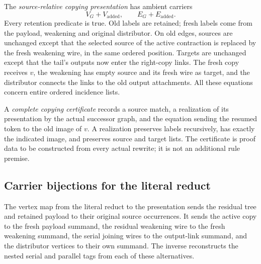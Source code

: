


The \emph{source-relative copying presentation} has ambient carriers
\[
 V_G+V_{\mathrm{added}},\qquad E_G+E_{\mathrm{added}}.
\]
Every retention predicate is true. Old labels are retained; fresh labels come
from the payload, weakening and original distributor. On old edges, sources
are unchanged except that the selected source of the active contraction is
replaced by the fresh weakening wire, in the same ordered position. Targets
are unchanged except that the tail's outputs now enter the right-copy links.
The fresh copy receives $v$, the weakening has empty source and its fresh wire
as target, and the distributor connects the links to the old output attachments.
All these equations concern entire ordered incidence lists.


A \emph{complete copying certificate} records a source match, a realization
of its presentation by the actual successor graph, and the equation sending
the resumed token to the old image of $v$. A realization preserves labels
recursively, has exactly the indicated image, and preserves source and target
lists. The certificate is proof data to be constructed from every actual
rewrite; it is not an additional rule premise.


\subsection{Carrier bijections for the literal reduct}

The vertex map from the literal reduct to the presentation sends the residual
tree and retained payload to their original source occurrences. It sends the
active copy to the fresh payload summand, the residual weakening wire to the
fresh weakening summand, the serial joining wires to the output-link summand,
and the distributor vertices to their own summand. The inverse reconstructs
the nested serial and parallel tags from each of these alternatives.

